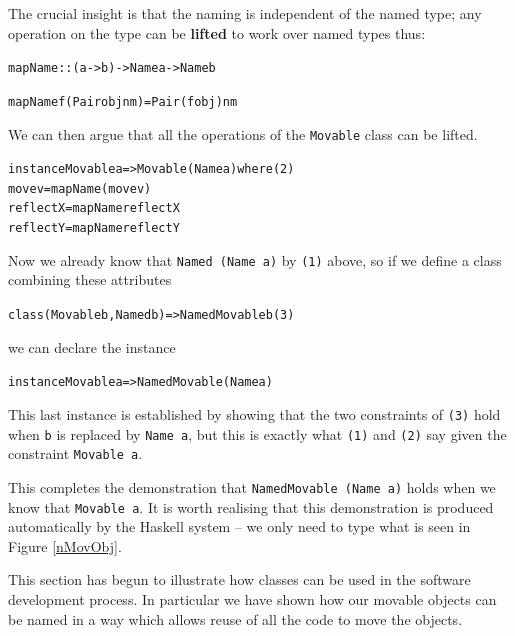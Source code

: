 The crucial insight is that the naming is independent of the named type; any
operation on the type can be \textbf{lifted} to work over named types thus:
\begin{alltt}
mapName :: (a -> b) -> Name a -> Name b

mapName f (Pair obj nm) = Pair (f obj) nm
\end{alltt}
We can then argue that all the operations of the \texttt{Movable} class can be
lifted.
\begin{alltt}
instance Movable a => Movable (Name a) where\hfill(2)
  move v   = mapName (move v)
  reflectX = mapName reflectX
  reflectY = mapName reflectY
\end{alltt}
Now we already know that \texttt{Named (Name a)} by \texttt{(1)} above, so
if we define a class combining these attributes
\begin{alltt}
class (Movable b, Named b) => NamedMovable b\hfill(3)
\end{alltt}
we can declare the instance
\begin{alltt}
instance Movable a => NamedMovable (Name a)
\end{alltt}
This last instance is established by showing that the two constraints of
\texttt{(3)} hold when \texttt{b} is replaced by \texttt{Name a},
but this is exactly what \texttt{(1)} and \texttt{(2)} say given the constraint 
\texttt{Movable a}. 


This completes the demonstration that \texttt{NamedMovable (Name a)}
holds when we know that \texttt{Movable a}. It is worth realising that this demonstration is
produced automatically by the Haskell system -- we only need to type what is
seen in Figure \ref{nMovObj}.

This section has begun to illustrate how classes can be used in the software
development process. In particular we have shown how our movable objects can
be named in a way which allows reuse of all the code to move the objects.



\vspace{8pt}

